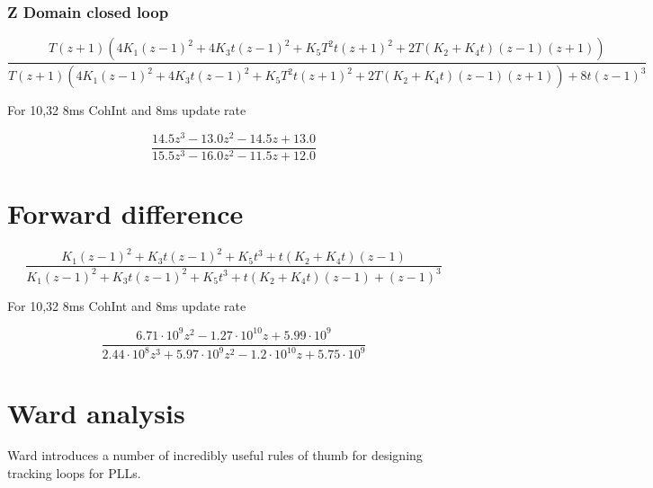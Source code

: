 \subsubsection{Z Domain closed loop}
\begin{equation}
\frac{T \left(z + 1\right) \left(4 K_{1} \left(z - 1\right)^{2} + 4 K_{3} t \left(z - 1\right)^{2} + K_{5} T^{2} t \left(z + 1\right)^{2} + 2 T \left(K_{2} + K_{4} t\right) \left(z - 1\right) \left(z + 1\right)\right)}{T \left(z + 1\right) \left(4 K_{1} \left(z - 1\right)^{2} + 4 K_{3} t \left(z - 1\right)^{2} + K_{5} T^{2} t \left(z + 1\right)^{2} + 2 T \left(K_{2} + K_{4} t\right) \left(z - 1\right) \left(z + 1\right)\right) + 8 t \left(z - 1\right)^{3}}
\end{equation}




For 10,32 8ms CohInt and 8ms update rate



\begin{equation}
\frac{14.5 z^{3} - 13.0 z^{2} - 14.5 z + 13.0}{15.5 z^{3} - 16.0 z^{2} - 11.5 z + 12.0}\end{equation}
\clearpage

\section{Forward difference}

\begin{equation}
\frac{K_{1} \left(z - 1\right)^{2} + K_{3} t \left(z - 1\right)^{2} + K_{5} t^{3} + t \left(K_{2} + K_{4} t\right) \left(z - 1\right)}{K_{1} \left(z - 1\right)^{2} + K_{3} t \left(z - 1\right)^{2} + K_{5} t^{3} + t \left(K_{2} + K_{4} t\right) \left(z - 1\right) + \left(z - 1\right)^{3}}
\end{equation}


For 10,32 8ms CohInt and 8ms update rate

\begin{equation}
\frac{6.71 \cdot 10^{9} z^{2} - 1.27 \cdot 10^{10} z + 5.99 \cdot 10^{9}}{2.44 \cdot 10^{8} z^{3} + 5.97 \cdot 10^{9} z^{2} - 1.2 \cdot 10^{10} z + 5.75 \cdot 10^{9}}
\end{equation}


\clearpage

\section{Ward analysis}

Ward introduces a number of incredibly useful rules of thumb for designing tracking loops for PLLs. 

